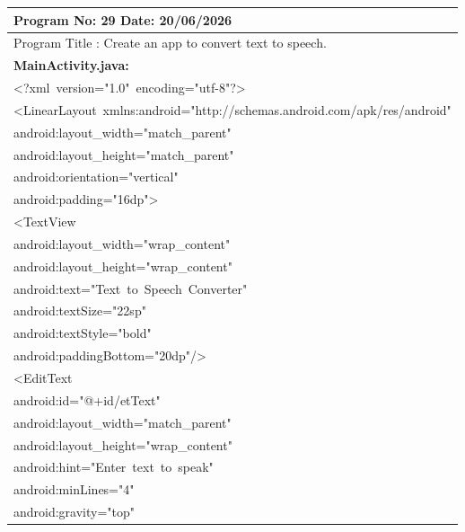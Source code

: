 \documentclass[a4paper,12pt]{article}
\begin{document}
\endgroup

\newpage

\noindent\begingroup
\renewcommand{\arraystretch}{1.1}
\begin{longtable}{|p{}|}
\hline\endfirsthead\hline\endhead\hline\endfoot\hline\endlastfoot
\rule{0pt}{13pt}Program No: 29 \hfill Date: 20/06/2026 \\
\hline
\rule{0pt}{13pt}Program Title : Create an app to convert text to speech. \\
\hline
\rule{0pt}{13pt}\textbf{MainActivity.java:} \\
\hline
{\ttfamily\small \textless{}?xml\ version="1.0"\ encoding="utf-8"?\textgreater{}} \\
{\ttfamily\small \textless{}LinearLayout\ xmlns:android="http://schemas.android.com/apk/res/android"} \\
{\ttfamily\small android:layout\_width="match\_parent"} \\
{\ttfamily\small android:layout\_height="match\_parent"} \\
{\ttfamily\small android:orientation="vertical"} \\
{\ttfamily\small android:padding="16dp"\textgreater{}} \\
{\ttfamily\small \textless{}TextView} \\
{\ttfamily\small android:layout\_width="wrap\_content"} \\
{\ttfamily\small android:layout\_height="wrap\_content"} \\
{\ttfamily\small android:text="Text\ to\ Speech\ Converter"} \\
{\ttfamily\small android:textSize="22sp"} \\
{\ttfamily\small android:textStyle="bold"} \\
{\ttfamily\small android:paddingBottom="20dp"/\textgreater{}} \\
{\ttfamily\small \textless{}EditText} \\
{\ttfamily\small android:id="@+id/etText"} \\
{\ttfamily\small android:layout\_width="match\_parent"} \\
{\ttfamily\small android:layout\_height="wrap\_content"} \\
{\ttfamily\small android:hint="Enter\ text\ to\ speak"} \\
{\ttfamily\small android:minLines="4"} \\
{\ttfamily\small android:gravity="top"} \\

\end{longtable}
\end{document}
